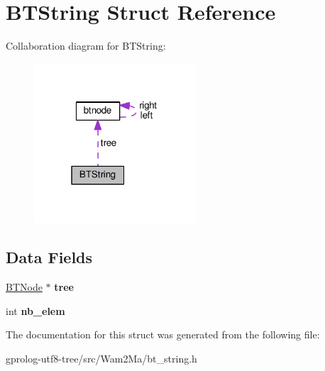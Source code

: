 \hypertarget{structBTString}{}\section{B\+T\+String Struct Reference}
\label{structBTString}


Collaboration diagram for B\+T\+String\+:\nopagebreak
\begin{figure}[H]
\begin{center}
\leavevmode
\includegraphics[width=171pt]{structBTString__coll__graph}
\end{center}
\end{figure}
\subsection*{Data Fields}
\begin{DoxyCompactItemize}
\item 
\hyperlink{structbtnode}{B\+T\+Node} $\ast$ {\bfseries tree}\hypertarget{structBTString_a3d5e702b03b4afc55252841d531836f8}{}\label{structBTString_a3d5e702b03b4afc55252841d531836f8}

\item 
int {\bfseries nb\+\_\+elem}\hypertarget{structBTString_a4248622c60ccba995140069c3c1fa116}{}\label{structBTString_a4248622c60ccba995140069c3c1fa116}

\end{DoxyCompactItemize}


The documentation for this struct was generated from the following file\+:\begin{DoxyCompactItemize}
\item 
gprolog-\/utf8-\/tree/src/\+Wam2\+Ma/bt\+\_\+string.\+h\end{DoxyCompactItemize}
